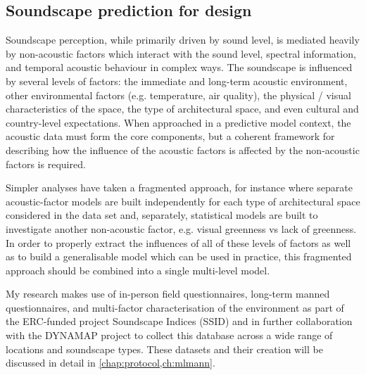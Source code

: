 
\subsection{Soundscape prediction for design}
Soundscape perception, while primarily driven by sound level, is mediated heavily by non-acoustic factors which interact with the sound level, spectral information, and temporal acoustic behaviour in complex ways. The soundscape is influenced by several levels of factors: the immediate and long-term acoustic environment, other environmental factors (e.g. temperature, air quality), the physical / visual characteristics of the space, the type of architectural space, and even cultural and country-level expectations. When approached in a predictive model context, the acoustic data must form the core components, but a coherent framework for describing how the influence of the acoustic factors is affected by the non-acoustic factors is required.

Simpler analyses have taken a fragmented approach, for instance where separate acoustic-factor models are built independently for each type of architectural space considered in the data set and, separately, statistical models are built to investigate another non-acoustic factor, e.g. visual greenness vs lack of greenness. In order to properly extract the influences of all of these levels of factors as well as to build a generalisable model which can be used in practice, this fragmented approach should be combined into a single multi-level model.

My research makes use of in-person field questionnaires, long-term manned questionnaires, and multi-factor characterisation of the environment as part of the ERC-funded project Soundscape Indices (SSID) and in further collaboration with the DYNAMAP project to collect this database across a wide range of locations and soundscape types. These datasets and their creation will be discussed in detail in \cref{chap:protocol,ch:mlmann}.

